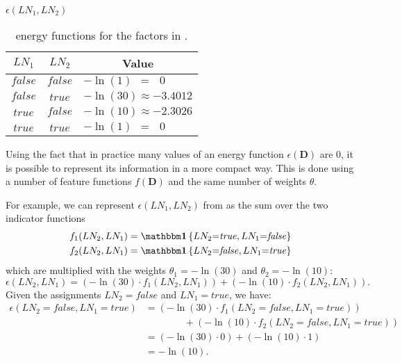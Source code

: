 \begin{table}[t]
\begin{center}
$\epsilon(LN_1,LN_2)$\par
\smallskip
\begin{tabular}{c c l}
 \toprule
 $LN_1$ & $LN_2$ & \multicolumn{1}{c}{Value} \\
 \midrule
 $\mathit{false}$ & $\mathit{false}$ & $-\ln(1)\ \ =\ \ \ 0$ \\
 $\mathit{false}$ & $\mathit{true}$ & $-\ln(30)\approx-3.4012$ \\
 $\mathit{true}$ & $\mathit{false}$ & $-\ln(10)\approx-2.3026$ \\
 $\mathit{true}$ & $\mathit{true}$ & $-\ln(1)\ \ =\ \ \ 0$ \\
 \bottomrule
\end{tabular}
\end{center}
\caption{\Glspl{energy function} for the \glspl{factor} in .}
\label{tab:example-energy-functions}
\end{table}

\bigskip

Using the fact that in practice many values of an \gls{energy function} $\epsilon(\mathbf{D})$ are $0$, it is possible to represent its information in a more compact way.
This is done using a number of \glspl{feature function} $f(\mathbf{D})$ and the same number of weights $\theta$.

For example, we can represent $\epsilon(LN_1,LN_2)$ from  as the sum over the two indicator functions
\begin{equation*}
  \begin{split}
    f_1(LN_2,LN_1)&=\identityfun\left\{LN_2{=}\mathit{true},LN_1{=}\mathit{false}\right\}\\
    f_2(LN_2,LN_1)&=\identityfun\left\{LN_2{=}\mathit{false},LN_1{=}\mathit{true}\right\}
  \end{split}
\end{equation*}
which are multiplied with the weights $\theta_1{=}-\ln(30)$ and $\theta_2{=}-\ln(10)$:
\begin{equation*}
  \epsilon\left(LN_2,LN_1\right)=\left(-\ln(30)\cdot f_1(LN_2,LN_1)\right)+\left(-\ln(10)\cdot f_2(LN_2,LN_1)\right).
\end{equation*}
Given the \glspl{assignment} $LN_2{=}\mathit{false}$ and $LN_1{=}\mathit{true}$, we have:
\begin{equation*}
  \begin{split}
  \epsilon\left(LN_2{=}\mathit{false},LN_1{=}\mathit{true}\right)&=\left(-\ln(30)\cdot f_1(LN_2{=}\mathit{false},LN_1{=}\mathit{true})\right)\\
  &\hspace{4em}+\left(-\ln(10)\cdot f_2(LN_2{=}\mathit{false},LN_1{=}\mathit{true})\right)\\
  &=\left(-\ln(30)\cdot 0\right)+\left(-\ln(10)\cdot 1\right)\\
  &=-\ln(10).
  \end{split}
\end{equation*}

